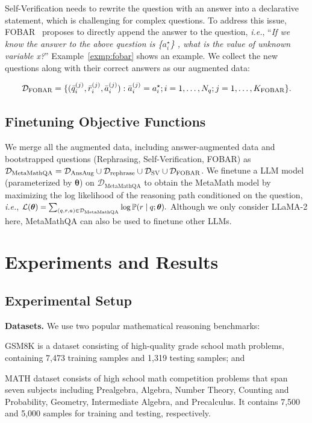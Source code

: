 Self-Verification needs to rewrite the question with an answer into a declarative statement, which is challenging for complex questions. To address this issue, FOBAR~\citep{jiang2023backward} proposes to directly append the answer to the question,
\emph{i.e.},
``\textit{If we know the answer to the above question is \{$a_i^\star$\} , what is the value of unknown variable {\normalfont x}?}''
Example~\ref{exmp:fobar}
shows an example. We collect the new questions along with their correct answers as our augmented data:

\begin{equation}
\small
    \mathcal{D}_{\text{FOBAR}} = \{(\bar{q}_i^{(j)}, \bar{r}_i^{(j)}, \bar{a}_i^{(j)}): \bar{a}_i^{(j)} = a_i^\star;  i=1,\dots, N_q; j=1,\dots, K_{\text{FOBAR}}\}.
\end{equation}

\subsection{Finetuning Objective Functions} We merge all the augmented data, including answer-augmented data and bootstrapped questions (Rephrasing, Self-Verification, FOBAR) as $ \small{	\mathcal{D}_{\text{MetaMathQA}} = \mathcal{D}_{\text{AnsAug}}  \cup \mathcal{D}_{\text{rephrase}} \cup \mathcal{D}_{\text{SV}} \cup \mathcal{D}_{\text{FOBAR}}}$.
We finetune a LLM model (parameterized by ${\boldsymbol \theta}$) on $\mathcal{D}_{\text{MetaMathQA}}$ to obtain the MetaMath model by maximizing the log likelihood of the reasoning path conditioned on the question, \emph{i.e.}, $\small{
\mathcal{L}({\boldsymbol \theta})= \sum_{(q, r, a) \in \mathcal{D}_{\text{MetaMathQA}} } \log \mathbb{P}(r \mid  q;{\boldsymbol \theta}).
\label{eq:mle}}$ Although we only consider LLaMA-2 here, MetaMathQA can also be used to finetune other LLMs.

\section{Experiments and Results}

    \subsection{Experimental Setup}\label{sec:expt-setup}

    \textbf{Datasets.}
    We use two popular mathematical reasoning benchmarks:

\begin{enumerate*}[(i), series = tobecont, itemjoin = ~~]
    \item GSM8K \citep{cobbe2021training} is a dataset consisting of high-quality grade school math problems, containing 7,473 training samples and 1,319 testing samples; and 
    \item MATH \citep{hendrycks2021measuring} dataset consists of high school math competition problems that span seven subjects including Prealgebra, Algebra, Number Theory, Counting and Probability, Geometry, Intermediate Algebra, and Precalculus. It contains 7,500 and 5,000 samples for training and testing, respectively.
    \end{enumerate*}

